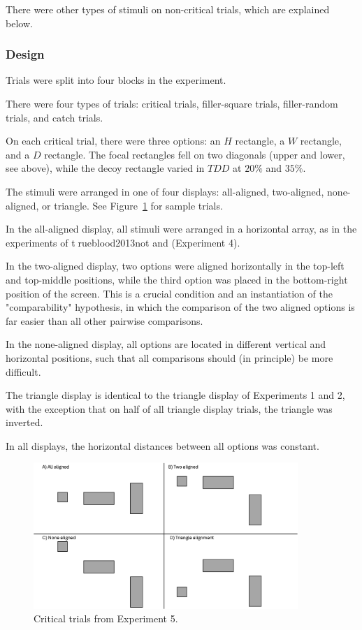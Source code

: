 There were other types of stimuli on non-critical trials, which are explained below.

\subsubsection{Design}
Trials were split into four blocks in the experiment.

There were four types of trials: critical trials, filler-square trials, filler-random trials, and catch trials.

On each critical trial, there were three options: an $H$ rectangle, a $W$ rectangle, and a $D$ rectangle. The focal rectangles fell on two diagonals (upper and lower, see above), while the decoy rectangle varied in $TDD$ at $20\%$ and $35\%$. 

The stimuli were arranged in one of four displays: all-aligned, two-aligned, none-aligned, or triangle. See Figure~\ref{fig:comparability_trials} for sample trials. 

In the all-aligned display, all stimuli were arranged in a horizontal array, as in the experiments of \textcircled{trueblood2013not} and \textcite{spektorWhenGoodLooks2018b} (Experiment 4). 

In the two-aligned display, two options were aligned horizontally in the top-left and top-middle positions, while the third option was placed in the bottom-right position of the screen. This is a crucial condition and an instantiation of the "comparability" hypothesis, in which the comparison of the two aligned options is far easier than all other pairwise comparisons.

In the none-aligned display, all options are located in different vertical and horizontal positions, such that all comparisons should (in principle) be more difficult.

The triangle display is identical to the triangle display of Experiments 1 and 2, with the exception that on half of all triangle display trials, the triangle was inverted.

In all displays, the horizontal distances between all options was constant.

\begin{figure}
   \includegraphics[width=100mm]{figures/comparability_design.jpg}
   \caption{Critical trials from Experiment 5.}
   \label{fig:comparability_trials}
\end{figure}

